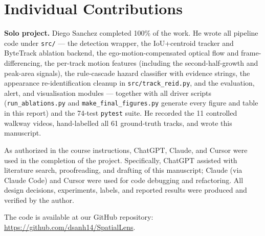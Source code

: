 \documentclass[10pt,twocolumn,letterpaper]{article}
\begin{document}
\section*{Individual Contributions}
\textbf{Solo project.} Diego Sanchez completed 100\% of the work. He
wrote all pipeline code under \texttt{src/} --- the detection wrapper,
the IoU+centroid tracker and ByteTrack ablation backend, the
ego-motion-compensated optical flow and frame-differencing, the
per-track motion features (including the second-half-growth and
peak-area signals), the rule-cascade hazard classifier with evidence
strings, the appearance re-identification cleanup in
\texttt{src/track\_reid.py}, and the evaluation, alert, and
visualisation modules --- together with all driver scripts
(\texttt{run\_ablations.py} and \texttt{make\_final\_figures.py}
generate every figure and table in this report) and the 74-test
\texttt{pytest} suite. He recorded the 11 controlled walkway videos,
hand-labelled all 61 ground-truth tracks, and wrote this manuscript.

As authorized in the course instructions, ChatGPT, Claude, and Cursor
were used in the completion of the project. Specifically, ChatGPT
assisted with literature search, proofreading, and drafting of this
manuscript; Claude (via Claude Code) and Cursor were used for code
debugging and refactoring. All design decisions, experiments, labels,
and reported results were produced and verified by the author.

The code is available at our GitHub repository:
\url{https://github.com/dsanh14/SpatialLens}.
\end{document}
